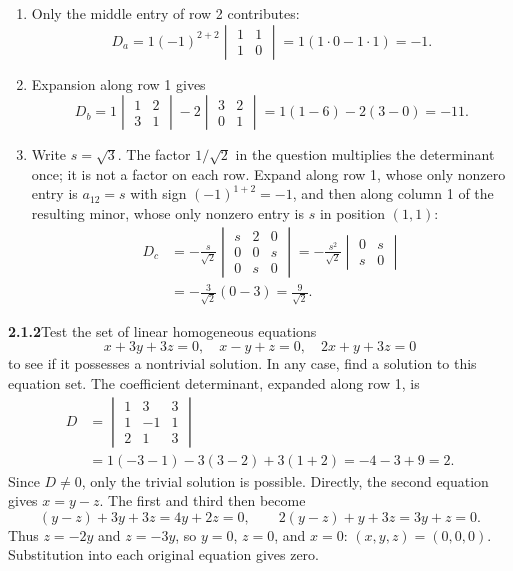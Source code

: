 \begin{enumerate}
\item[(a)] Only the middle entry of row 2 contributes:
\[
D_a=1(-1)^{2+2}
\begin{vmatrix}1&1\\1&0\end{vmatrix}
=1(1\cdot0-1\cdot1)=\boxed{-1}.
\]
\item[(b)] Expansion along row 1 gives
\[
D_b=1\begin{vmatrix}1&2\\3&1\end{vmatrix}
-2\begin{vmatrix}3&2\\0&1\end{vmatrix}
 =1(1-6)-2(3-0)=\boxed{-11}.
\]
\item[(c)] Write $s=\sqrt3$. The factor $1/\sqrt2$ in the question
multiplies the determinant once; it is not a factor on each row.
Expand along row 1, whose only nonzero entry is $a_{12}=s$ with sign
$(-1)^{1+2}=-1$, and then along column 1 of the resulting minor, whose
only nonzero entry is $s$ in position $(1,1)$:
\[
\begin{aligned}
D_c
&=-\frac{s}{\sqrt2}
\begin{vmatrix}s&2&0\\0&0&s\\0&s&0\end{vmatrix}
 =-\frac{s^2}{\sqrt2}
\begin{vmatrix}0&s\\s&0\end{vmatrix}\\
&=-\frac{3}{\sqrt2}(0-3)=\boxed{\frac9{\sqrt2}}.
\end{aligned}
\]
\end{enumerate}

\par\bigskip
\noindent\textbf{2.1.2}\quad Test the set of linear homogeneous equations
\[
x+3y+3z=0,\quad x-y+z=0,\quad 2x+y+3z=0
\]
to see if it possesses a nontrivial solution. In any case, find a solution to
this equation set.
\solution
The coefficient determinant, expanded along row 1, is
\[
\begin{aligned}
D&=\begin{vmatrix}1&3&3\\1&-1&1\\2&1&3\end{vmatrix}\\
 &=1(-3-1)-3(3-2)+3(1+2)=-4-3+9=2.
\end{aligned}
\]
Since $D\ne0$, only the trivial solution is possible. Directly,
the second equation gives $x=y-z$. The first and third then become
\[
(y-z)+3y+3z=4y+2z=0,\qquad
2(y-z)+y+3z=3y+z=0.
\]
Thus $z=-2y$ and $z=-3y$, so $y=0$, $z=0$, and $x=0$:
$\boxed{(x,y,z)=(0,0,0)}$.
Substitution into each original equation gives zero.

